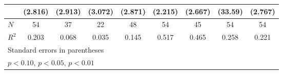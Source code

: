 {\begin{tabular}{l*{8}{c}}
            &     (2.816)         &     (2.913)         &     (3.072)         &     (2.871)         &     (2.215)         &     (2.667)         &     (33.59)         &     (2.767)         \\
\hline
\(N\)       &          54         &          37         &          22         &          48         &          54         &          45         &          54         &          54         \\
\(R^{2}\)   &       0.203         &       0.068         &       0.035         &       0.145         &       0.517         &       0.465         &       0.258         &       0.221         \\
\hline\hline
\multicolumn{9}{l}{\footnotesize Standard errors in parentheses}\\
\multicolumn{9}{l}{\footnotesize \sym{*} \(p<0.10\), \sym{**} \(p<0.05\), \sym{***} \(p<0.01\)}\\
\end{tabular}
}

